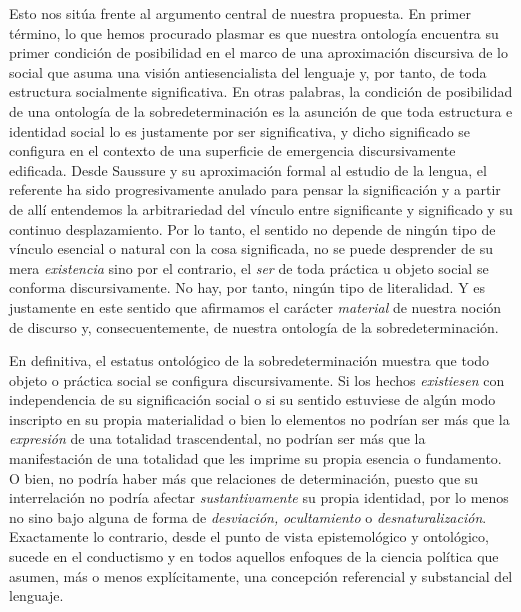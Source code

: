 Esto nos sitúa frente al argumento central de nuestra propuesta. En primer término, lo que hemos procurado plasmar es que nuestra ontología encuentra su primer condición de posibilidad en el marco de una aproximación discursiva de lo social que asuma una visión antiesencialista del lenguaje y, por tanto, de toda estructura socialmente significativa. En otras palabras, la condición de posibilidad de una ontología de la sobredeterminación es la asunción de que toda estructura e identidad social lo es justamente por ser significativa, y dicho significado se configura en el contexto de una superficie de emergencia discursivamente edificada. Desde Saussure y su aproximación formal al estudio de la lengua, el referente ha sido progresivamente anulado para pensar la significación y a partir de allí entendemos la arbitrariedad del vínculo entre significante y significado y su continuo desplazamiento. Por lo tanto, el sentido no depende de ningún tipo de vínculo esencial o natural con la cosa significada, no se puede desprender de su mera \emph{existencia}  sino por el contrario, el \emph{ser} de toda práctica u objeto social se conforma discursivamente. No hay, por tanto, ningún tipo de literalidad. Y es justamente en este sentido que afirmamos el carácter \emph{material} de nuestra noción de discurso y, consecuentemente, de nuestra ontología de la sobredeterminación.

En definitiva, el estatus ontológico de la sobredeterminación muestra que todo objeto o práctica social se configura discursivamente. Si los hechos \emph{existiesen} con independencia de su significación social o si su sentido estuviese de algún modo inscripto en su propia materialidad  o bien lo elementos no podrían ser más que la \emph{expresión} de una totalidad trascendental, no podrían ser más que la manifestación de una totalidad que les imprime su propia esencia o fundamento. O bien, no podría haber más que relaciones de determinación, puesto que su interrelación no podría afectar \emph{sustantivamente} su propia identidad, por lo menos no sino bajo alguna de forma de \emph{desviación,} \emph{ocultamiento} o \emph{desnaturalización}. Exactamente lo contrario, desde el punto de vista epistemológico y ontológico, sucede en el conductismo y en todos aquellos enfoques de la ciencia política que asumen, más o menos explícitamente, una concepción referencial y substancial del lenguaje.

